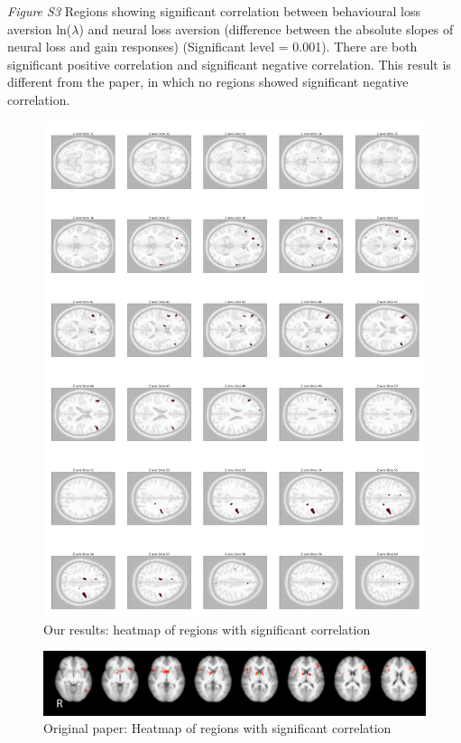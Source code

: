 \documentclass[11pt]{article}
\begin{document}
\newpage

\emph{Figure S3} Regions showing significant correlation between behavioural loss aversion ln($\lambda$) and neural loss aversion (difference between the absolute slopes of neural loss and gain responses) (Significant level = 0.001). There are both significant positive correlation and significant negative correlation. This result is different from the paper, in which no regions showed significant negative correlation.

\begin{figure}[H]
    \centering
        \includegraphics[scale=0.105]{figures/Regression3/sig_cor_z_neural_aversion.png}
    \caption{Our results: heatmap of regions with significant correlation}
\end{figure}

\begin{figure}[H]
    \centering
        \includegraphics[scale=0.5]{figures/Regression3/Orig_sig_cor_z_neural_aversion.png}
    \caption{Original paper: Heatmap of regions with significant correlation}
\end{figure}
\end{document}
